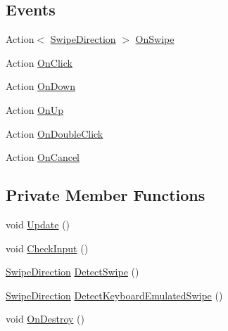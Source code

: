 \subsection*{Events}
\begin{DoxyCompactItemize}
\item 
Action$<$ \mbox{\hyperlink{class_v_r_standard_assets_1_1_utils_1_1_v_r_input_a2ea76769ddd926c08921d6684d332538}{Swipe\+Direction}} $>$ \mbox{\hyperlink{class_v_r_standard_assets_1_1_utils_1_1_v_r_input_a514bc58871fa0f6dbe7906a210baedb4}{On\+Swipe}}
\item 
Action \mbox{\hyperlink{class_v_r_standard_assets_1_1_utils_1_1_v_r_input_aef5ca345e6f0931cbd27794bec5b8625}{On\+Click}}
\item 
Action \mbox{\hyperlink{class_v_r_standard_assets_1_1_utils_1_1_v_r_input_a4b0437e852ada367a1a4a7316b8afefe}{On\+Down}}
\item 
Action \mbox{\hyperlink{class_v_r_standard_assets_1_1_utils_1_1_v_r_input_a96e97c6dceae4e43aee27d3fbe4ee29a}{On\+Up}}
\item 
Action \mbox{\hyperlink{class_v_r_standard_assets_1_1_utils_1_1_v_r_input_a6114e4322f194534fe265b4242b534a1}{On\+Double\+Click}}
\item 
Action \mbox{\hyperlink{class_v_r_standard_assets_1_1_utils_1_1_v_r_input_a6b6478f12f71a065e2448de07bf44dfa}{On\+Cancel}}
\end{DoxyCompactItemize}
\subsection*{Private Member Functions}
\begin{DoxyCompactItemize}
\item 
void \mbox{\hyperlink{class_v_r_standard_assets_1_1_utils_1_1_v_r_input_a811fbf86569a35075b16df5e8e51522d}{Update}} ()
\item 
void \mbox{\hyperlink{class_v_r_standard_assets_1_1_utils_1_1_v_r_input_a194207fffdfb2f9183be96dc3280a8a5}{Check\+Input}} ()
\item 
\mbox{\hyperlink{class_v_r_standard_assets_1_1_utils_1_1_v_r_input_a2ea76769ddd926c08921d6684d332538}{Swipe\+Direction}} \mbox{\hyperlink{class_v_r_standard_assets_1_1_utils_1_1_v_r_input_a7a537a50a8bcd6943bc0440a235de87c}{Detect\+Swipe}} ()
\item 
\mbox{\hyperlink{class_v_r_standard_assets_1_1_utils_1_1_v_r_input_a2ea76769ddd926c08921d6684d332538}{Swipe\+Direction}} \mbox{\hyperlink{class_v_r_standard_assets_1_1_utils_1_1_v_r_input_a2d38977aebcf43eed5d8a7d61a650b8c}{Detect\+Keyboard\+Emulated\+Swipe}} ()
\item 
void \mbox{\hyperlink{class_v_r_standard_assets_1_1_utils_1_1_v_r_input_aae660444b23ba964269c46576e3e15c0}{On\+Destroy}} ()
\end{DoxyCompactItemize}
